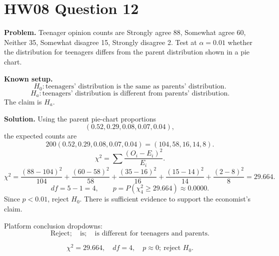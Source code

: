 \documentclass[11pt]{article}
\begin{document}
\section*{HW08 Question 12}

\textbf{Problem.} Teenager opinion counts are Strongly agree 88, Somewhat agree 60, Neither 35, Somewhat disagree 15, Strongly disagree 2. Test at \(\alpha=0.01\) whether the distribution for teenagers differs from the parent distribution shown in a pie chart.

\textbf{Known setup.}
\[
H_0:\text{teenagers' distribution is the same as parents' distribution.}
\]
\[
H_a:\text{teenagers' distribution is different from parents' distribution.}
\]
The claim is \(H_a\).

\textbf{Solution.} Using the parent pie-chart proportions
\[
(0.52,0.29,0.08,0.07,0.04),
\]
the expected counts are
\[
200(0.52,0.29,0.08,0.07,0.04)=(104,58,16,14,8).
\]
\[
\chi^2=\sum\frac{(O_i-E_i)^2}{E_i}.
\]
\[
\chi^2
=\frac{(88-104)^2}{104}
+\frac{(60-58)^2}{58}
+\frac{(35-16)^2}{16}
+\frac{(15-14)^2}{14}
+\frac{(2-8)^2}{8}
=29.664.
\]
\[
df=5-1=4,\qquad p=P(\chi^2_4\ge29.664)\approx0.0000.
\]
Since \(p<0.01\), reject \(H_0\). There is sufficient evidence to support the economist's claim.

Platform conclusion dropdowns:
\[
\boxed{\text{Reject};\quad \text{is};\quad \text{is different for teenagers and parents.}}
\]

\[
\boxed{\chi^2=29.664,\quad df=4,\quad p\approx0;\ \text{reject }H_0.}
\]
\end{document}
